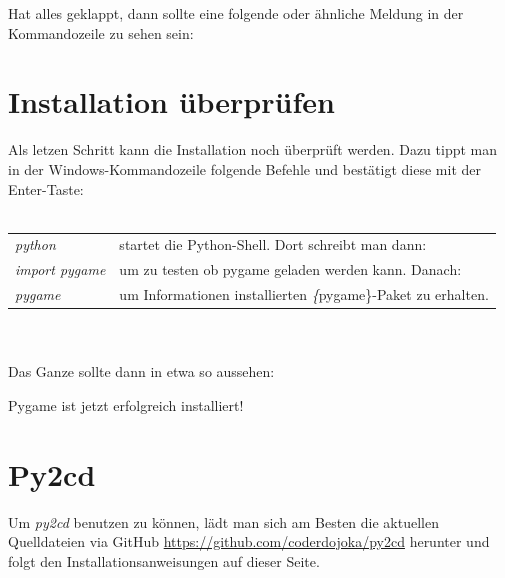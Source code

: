 \documentclass[ngerman,oneside, a4letter]{article}
\begin{document}
\pagebreak
\noindent Hat alles geklappt, dann sollte eine folgende oder ähnliche Meldung in der Kommandozeile zu sehen sein:
\begin{center}
\end{center}

\pagebreak
\section{Installation überprüfen}
Als letzen Schritt kann die Installation noch überprüft werden.
Dazu tippt man in der Windows-Kommandozeile folgende Befehle und bestätigt diese mit der Enter-Taste:
\\
\\
\begin{table}[h]
	\begin{tabular}{ll}

		\emph{python}        & startet die Python-Shell. Dort schreibt man dann:            \\ 
		\emph{import pygame} & um zu testen ob pygame geladen werden kann. Danach:                \\ 
		\emph{pygame}        & um Informationen  installierten \emph\{pygame\}-Paket zu erhalten. \\ 
	\end{tabular}
\end{table}
\\
\\
Das Ganze sollte dann in etwa so aussehen:
\begin{center}
\end{center}
Pygame ist jetzt erfolgreich installiert!

\section{Py2cd}
Um \emph{py2cd} benutzen zu können, lädt man sich am Besten die aktuellen Quelldateien via GitHub \url{https://github.com/coderdojoka/py2cd} herunter und folgt den Installationsanweisungen auf dieser Seite.
\end{document}
